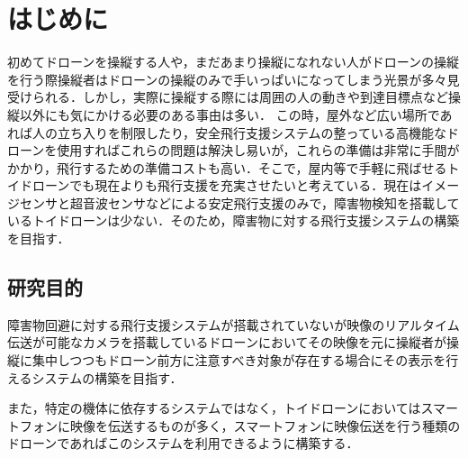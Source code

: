\section{はじめに}
初めてドローンを操縦する人や，まだあまり操縦になれない人がドローンの操縦を行う際操縦者はドローンの操縦のみで手いっぱいになってしまう光景が多々見受けられる．しかし，実際に操縦する際には周囲の人の動きや到達目標点など操縦以外にも気にかける必要のある事由は多い．
この時，屋外など広い場所であれば人の立ち入りを制限したり，安全飛行支援システムの整っている高機能なドローンを使用すればこれらの問題は解決し易いが，これらの準備は非常に手間がかかり，飛行するための準備コストも高い．そこで，屋内等で手軽に飛ばせるトイドローンでも現在よりも飛行支援を充実させたいと考えている．現在はイメージセンサと超音波センサなどによる安定飛行支援のみで，障害物検知を搭載しているトイドローンは少ない．そのため，障害物に対する飛行支援システムの構築を目指す．

%

\subsection{研究目的}
%
障害物回避に対する飛行支援システムが搭載されていないが映像のリアルタイム伝送が可能なカメラを搭載しているドローンにおいてその映像を元に操縦者が操縦に集中しつつもドローン前方に注意すべき対象が存在する場合にその表示を行えるシステムの構築を目指す．

また，特定の機体に依存するシステムではなく，トイドローンにおいてはスマートフォンに映像を伝送するものが多く，スマートフォンに映像伝送を行う種類のドローンであればこのシステムを利用できるように構築する．
